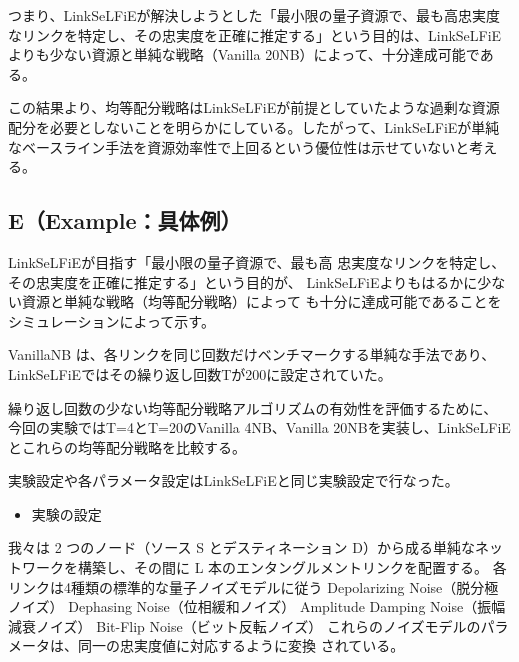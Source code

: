 \documentclass[conference]{IEEEtran}
\begin{document}
つまり、LinkSeLFiEが解決しようとした「最小限の量子資源で、最も高忠実度
なリンクを特定し、その忠実度を正確に推定する」という目的は、LinkSeLFiE
よりも少ない資源と単純な戦略（Vanilla 20NB）によって、十分達成可能である。

この結果より、均等配分戦略はLinkSeLFiEが前提としていたような過剰な資源
配分を必要としないことを明らかにしている。したがって、LinkSeLFiEが単純
なベースライン手法を資源効率性で上回るという優位性は示せていないと考え
る。
\subsection{E（Example：具体例）}
\label{sec:org15ef5a9}
LinkSeLFiEが目指す「最小限の量子資源で、最も高
忠実度なリンクを特定し、その忠実度を正確に推定する」という目的が、
LinkSeLFiEよりもはるかに少ない資源と単純な戦略（均等配分戦略）によって
も十分に達成可能であることをシミュレーションによって示す。

VanillaNB は、各リンクを同じ回数だけベンチマークする単純な手法であり、
LinkSeLFiEではその繰り返し回数Tが200に設定されていた。

繰り返し回数の少ない均等配分戦略アルゴリズムの有効性を評価するために、
今回の実験ではT=4とT=20のVanilla 4NB、Vanilla 20NBを実装し、LinkSeLFiE
とこれらの均等配分戦略を比較する。

実験設定や各パラメータ設定はLinkSeLFiEと同じ実験設定で行なった。

\begin{itemize}
\item 実験の設定
\end{itemize}
我々は 2 つのノード（ソース S とデスティネーション D）から成る単純なネッ
トワークを構築し、その間に L 本のエンタングルメントリンクを配置する。
各リンクは4種類の標準的な量子ノイズモデルに従う
Depolarizing Noise（脱分極ノイズ）
Dephasing Noise（位相緩和ノイズ）
Amplitude Damping Noise（振幅減衰ノイズ）
Bit-Flip Noise（ビット反転ノイズ）
これらのノイズモデルのパラメータは、同一の忠実度値に対応するように変換
されている。
\end{document}
